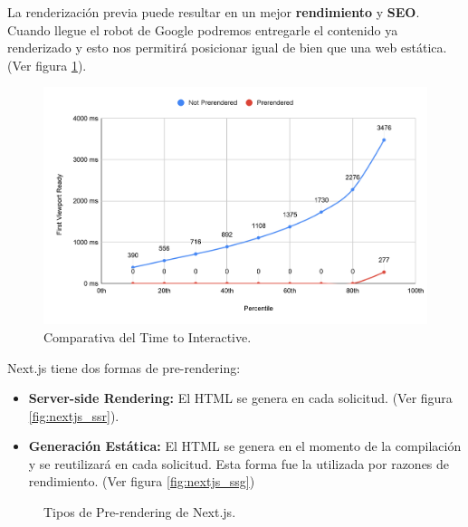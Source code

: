 \documentclass[12pt,twoside,titlepage]{report}
\begin{document}
\begin{itemize}
       La renderización previa puede resultar en un mejor \textbf{rendimiento} y \textbf{SEO}. Cuando llegue el robot de Google podremos entregarle el contenido ya renderizado y esto nos permitirá posicionar igual de bien que una web estática. (Ver figura \ref{fig:nextjs_prerenderinggraph}).

    \begin{figure}[H]
        \centering
        \includegraphics[scale=0.16]{Nextjs/PrerenderComparation}
        \caption{Comparativa del Time to Interactive.}
        \label{fig:nextjs_prerenderinggraph}
    \end{figure}
    

    Next.js tiene dos formas de pre-rendering:
    \begin{itemize}
        \item \textbf{Server-side Rendering:} El HTML se genera en cada solicitud. (Ver figura \ref{fig:nextjs_ssr}).
        \item \textbf{Generación Estática:} El HTML se genera en el momento de la compilación y se reutilizará en cada solicitud. Esta forma fue la utilizada por razones de rendimiento. (Ver figura \ref{fig:nextjs_ssg})
    \end{itemize}
    \begin{figure}[H]
        \centering
        \caption{Tipos de Pre-rendering de Next.js.}
        \label{fig:TiposPrerendering}
       \end{figure}


\end{itemize}
\end{document}
